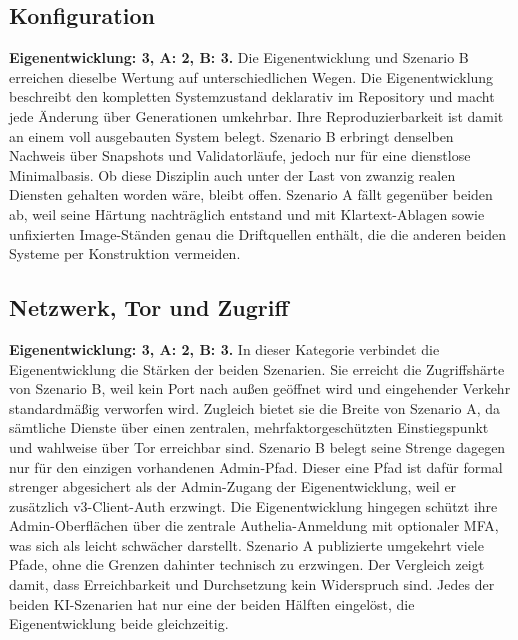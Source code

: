 \subsection{Konfiguration}
\textbf{Eigenentwicklung: 3, A: 2, B: 3.} Die Eigenentwicklung und Szenario B erreichen dieselbe Wertung auf unterschiedlichen Wegen. 
Die Eigenentwicklung beschreibt den kompletten Systemzustand deklarativ im Repository und macht
jede Änderung über Generationen umkehrbar. Ihre Reproduzierbarkeit ist damit an einem voll ausgebauten System belegt.
Szenario B erbringt denselben Nachweis über Snapshots und Validatorläufe, jedoch nur für eine dienstlose
Minimalbasis. Ob diese Disziplin auch unter der Last von zwanzig realen Diensten gehalten worden wäre, bleibt offen. 
Szenario A fällt gegenüber beiden ab, weil seine Härtung nachträglich entstand und mit Klartext-Ablagen sowie unfixierten Image-Ständen genau die Driftquellen enthält, die die anderen beiden Systeme per Konstruktion vermeiden.\cite{runbookA,selfauditA,implementationlogB,validatornotesB}

\subsection{Netzwerk, Tor und Zugriff}
\textbf{Eigenentwicklung: 3, A: 2, B: 3.} In dieser Kategorie verbindet die Eigenentwicklung die Stärken der beiden Szenarien. Sie erreicht die Zugriffshärte von Szenario B, weil kein Port nach außen geöffnet wird und eingehender Verkehr standardmäßig verworfen wird. Zugleich bietet sie die Breite von Szenario A, da sämtliche Dienste über einen zentralen, mehrfaktorgeschützten Einstiegspunkt und wahlweise über Tor erreichbar sind.
Szenario B belegt seine Strenge dagegen nur für den einzigen vorhandenen Admin-Pfad. Dieser eine Pfad ist dafür formal strenger abgesichert als der Admin-Zugang der Eigenentwicklung, weil er zusätzlich v3-Client-Auth erzwingt. Die Eigenentwicklung hingegen schützt ihre Admin-Oberflächen über die zentrale Authelia-Anmeldung mit optionaler \ac{MFA}, was sich als leicht schwächer darstellt.
Szenario A publizierte umgekehrt viele Pfade, ohne die Grenzen dahinter technisch zu erzwingen. Der Vergleich zeigt damit, dass Erreichbarkeit und Durchsetzung kein Widerspruch sind. 
Jedes der beiden \ac{KI}-Szenarien hat nur eine der beiden Hälften eingelöst, die Eigenentwicklung beide gleichzeitig.\cite{runbookA,selfauditA,finalsummaryB,validatornotesB}

